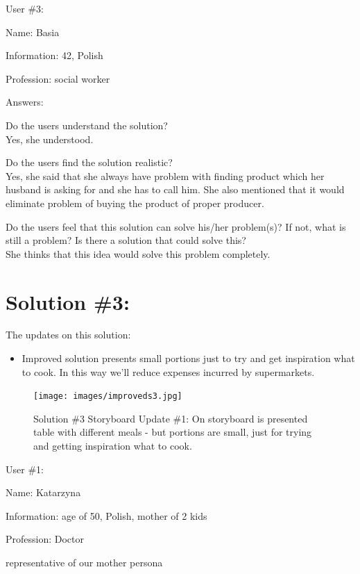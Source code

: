 \documentclass[a4paper,10pt,oneside]{scrreprt}
\begin{document}
\bigskip
User \#3:
\begin{compactitem}
	\item Name: Basia
	\item Information: 42, Polish
	\item Profession: social worker
\end{compactitem}
\bigskip
Answers:
\begin{compactitem}
	\item Do the users understand the solution?\\
	Yes, she understood.
	\item Do the users find the solution realistic?\\
	Yes, she said that she always have problem with finding product which her husband is asking for and she has to call him. She also mentioned that it would eliminate problem of buying the product of proper producer.\\
	\item Do the users feel that this solution can solve his/her problem(s)? If not, what is still
	a problem? Is there a solution that could solve this?\\
	She thinks that this idea would solve this problem completely.\\
\end{compactitem}
\clearpage

\section{Solution \#3:}
The updates on this solution:
\begin{itemize}
	\item Improved solution presents small portions just to try and get inspiration what to cook. In this way we'll reduce expenses incurred by supermarkets.

\end{itemize}

\begin{figure}[H]
	\centering
	\texttt{[image: images/improveds3.jpg]}
	\caption{Solution \#3 Storyboard Update \#1: \newline On storyboard is presented table with different meals - but portions are small, just for trying and getting inspiration what to cook.}
\end{figure}

User \#1:
\begin{compactitem}
	\item Name: Katarzyna
	\item Information: age of 50, Polish, mother of 2 kids
	\item Profession: Doctor
	\item representative of our mother persona
\end{compactitem}
\bigskip
\end{document}
